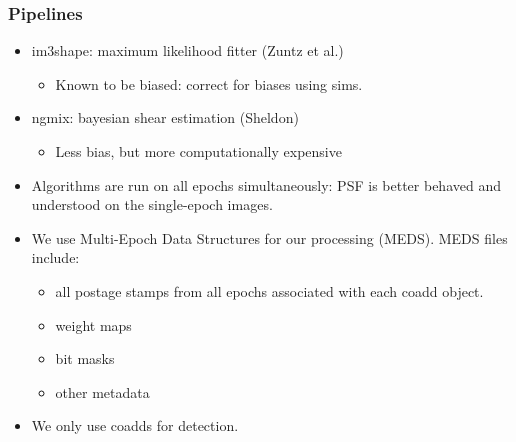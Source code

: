 \documentclass{beamer}
\begin{document}
\frame
{
    \frametitle{Pipelines}

    \fontsize{9}{0.8\baselineskip}
    \begin{itemize}
                \item im3shape: maximum likelihood fitter (Zuntz et al.)
                    \begin{itemize}
                        \item Known to be biased: correct for biases using sims.
                    \end{itemize}
                \item ngmix: bayesian shear estimation (Sheldon)
                    \begin{itemize}
                        \item Less bias, but more computationally expensive
                    \end{itemize}

        \item Algorithms are run on all epochs simultaneously: PSF is
            better behaved and understood on the single-epoch images.

        \item We use Multi-Epoch Data Structures for our processing (MEDS).
            MEDS files include:
            \begin{itemize}
                \item all postage stamps from all epochs associated with
                    each coadd object.
                \item weight maps
                \item bit masks
                \item other metadata
            \end{itemize}

        \item We only use coadds for detection.

    \end{itemize}
}
\end{document}
